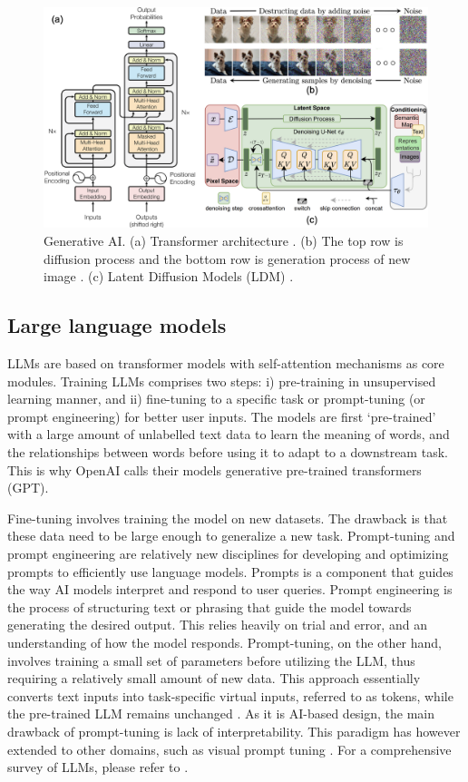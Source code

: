 \documentclass[11pt,a4paper]{article}
\begin{document}
\begin{figure}
    \centering
    \includegraphics[width=\textwidth]{figures/generativemodel.png}
    \caption{Generative AI. (a) Transformer architecture \cite{Vaswani:attention:2017}. (b) The top row is diffusion process and the bottom row is generation process of new image \cite{Yang:diffusion:2023}. (c) Latent Diffusion Models (LDM) \cite{Rombach:LDM:2022}. }
    \label{fig:generativemodel}
\end{figure}

\subsection{Large language models}
\label{ssec:llms}

LLMs are based on transformer models with  self-attention mechanisms as core modules. Training LLMs comprises two steps: i) pre-training in unsupervised learning manner, and ii) fine-tuning to a specific task or prompt-tuning (or prompt engineering) for better user inputs. The models are first `pre-trained' with a large amount of unlabelled text data to learn the meaning of words, and the relationships between words before using it to adapt to a downstream task. This is why OpenAI calls their models generative pre-trained transformers (GPT). 

Fine-tuning involves training the model on new datasets. The drawback is that these data need to be large enough to generalize a new task. Prompt-tuning and prompt engineering are relatively new disciplines for developing and optimizing prompts to efficiently use language models. Prompts is a component that guides the way AI models interpret and respond to user queries. Prompt engineering is the process of structuring text or phrasing that guide the model towards generating the desired output. This relies heavily on trial and error, and an understanding of how the model responds. 
Prompt-tuning, on the other hand, involves training a small set of parameters before utilizing the LLM, thus requiring a relatively small amount of new data. This approach essentially converts text inputs into task-specific virtual inputs, referred to as tokens, while the pre-trained LLM remains unchanged \cite{Lester:power:2021}. As it is AI-based design, the main drawback of prompt-tuning is lack of interpretability. This paradigm has however extended to other domains, such as visual prompt tuning \cite{Jia:VPT:2022}. For a comprehensive survey of LLMs, please refer to \cite{zhao:survey:2023}.
\end{document}

